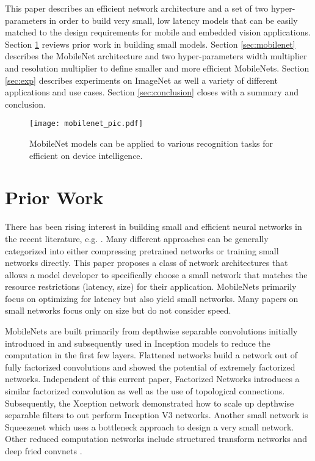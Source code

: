 \documentclass[10pt,twocolumn,letterpaper]{article}
\begin{document}
This paper describes an efficient network architecture and a set of two hyper-parameters in order to build very small, low latency models that can be easily matched to the design requirements for mobile and embedded vision applications. Section \ref{sec:prior} reviews prior work in building small models. Section \ref{sec:mobilenet} describes the MobileNet architecture and two hyper-parameters width multiplier and resolution multiplier to define smaller and more efficient MobileNets. Section \ref{sec:exp} describes experiments on ImageNet as well a variety of different applications and use cases. Section \ref{sec:conclusion} closes with a summary and conclusion.

\begin{figure*}
\centering
\texttt{[image: mobilenet\_pic.pdf]}
  \caption{MobileNet models can be applied to various recognition tasks for efficient on device intelligence.}
  \label{fig:conv_layers}
\end{figure*}

\section{Prior Work} \label{sec:prior}
There has been rising interest in building small and efficient neural networks in the recent literature, e.g. \cite{jin2014flattened,wang2016factorized,iandola2016squeezenet,wu2015quantized,rastegari2016xnor}. Many different approaches can be generally categorized into either compressing pretrained networks or training small networks directly. This paper proposes a class of network architectures that allows a model developer to specifically choose a small network that matches the resource restrictions (latency, size) for their application. MobileNets primarily focus on optimizing for latency but also yield small networks. Many papers on small networks focus only on size but do not consider speed.

MobileNets are built primarily from depthwise separable convolutions initially introduced in \cite{sifre2014rigid} and subsequently used in Inception models \cite{ioffe2015batch} to reduce the computation in the first few layers. Flattened networks \cite{jin2014flattened} build a network out of fully factorized convolutions and showed the potential of extremely factorized networks. Independent of this current paper, Factorized Networks\cite{wang2016factorized} introduces a similar factorized convolution as well as the use of topological connections. Subsequently, the Xception network \cite{chollet2016deep} demonstrated how to scale up depthwise separable filters to out perform Inception V3 networks. Another small network is Squeezenet \cite{iandola2016squeezenet} which uses a bottleneck approach to design a very small network. Other reduced computation networks include structured transform networks \cite{sindhwani2015structured} and deep fried convnets \cite{yang2015deep}.
\end{document}
